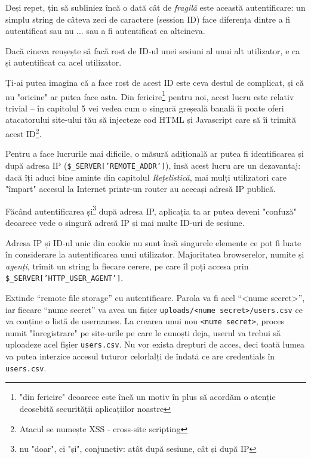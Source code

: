 Deși repet, țin să subliniez încă o dată cât de \textit{fragilă} este această
autentificare: un simplu string de câteva zeci de caractere
(session ID) face diferența dintre a fi autentificat sau nu ... sau
a fi autentificat ca altcineva.

Dacă cineva reușește să facă rost de ID-ul unei sesiuni al unui
alt utilizator, e ca și autentificat ca acel utilizator.

Ți-ai putea imagina că a face rost de acest ID este ceva destul de
complicat, și că nu "oricine" ar putea face asta. Din fericire\footnote{"din
fericire" deoarece este încă un motiv în plus să acordăm o atenție
deosebită securității aplicațiilor noastre} pentru noi, acest lucru este
relativ trivial  -- în capitolul 5 vei vedea cum o singură greșeală
banală îi poate oferi atacatorului site-ului tău să injecteze cod HTML
și Javascript care să îi trimită acest ID\footnote{Atacul se numește
XSS - cross-site scripting}.

Pentru a face lucrurile mai dificile, o măsură adițională ar putea
fi identificarea și după adresa IP (\texttt{\$\_SERVER['REMOTE\_ADDR']}),
însă acest lucru are un dezavantaj: dacă îți aduci bine aminte din
capitolul \textit{Rețelistică}, mai mulți utilizatori care "împart"
accesul la Internet printr-un router au aceeași adresă IP publică.

Făcând autentificarea și\footnote{nu "doar", ci "și", conjunctiv: atât
după sesiune, cât și după IP} după adresa IP, aplicația ta ar putea
deveni "confuză" deoarece vede o singură adresă IP și mai multe
ID-uri de sesiune.

Adresa IP și ID-ul unic din cookie nu sunt însă singurele elemente
ce pot fi luate în considerare la autentificarea unui utilizator.
Majoritatea browserelor, numite și \textsl{agenți}, trimit un string
la fiecare cerere, pe care îl poți accesa prin \texttt{\$\_SERVER['HTTP\_USER\_AGENT']}.

\begin{Exercise}[title={O schemă de autentificare ieșită din comun},difficulty=2]
Extinde ``remote file storage'' cu autentificare.
Parola va fi acel ``<nume secret>'', iar fiecare ``nume
secret'' va avea un fișier \texttt{uploads/<nume secret>/users.csv}
ce va conține o listă de usernames. La crearea unui nou \texttt{<nume secret>},
proces numit "înregistrare" pe site-urile pe care le cunoști deja,
userul va trebui să uploadeze acel fișier \texttt{users.csv}. Nu vor exista
drepturi de acces, deci toată lumea va putea interzice accesul tuturor celorlalți
de \^indată ce are credentials \^in \texttt{users.csv}.
\end{Exercise}

